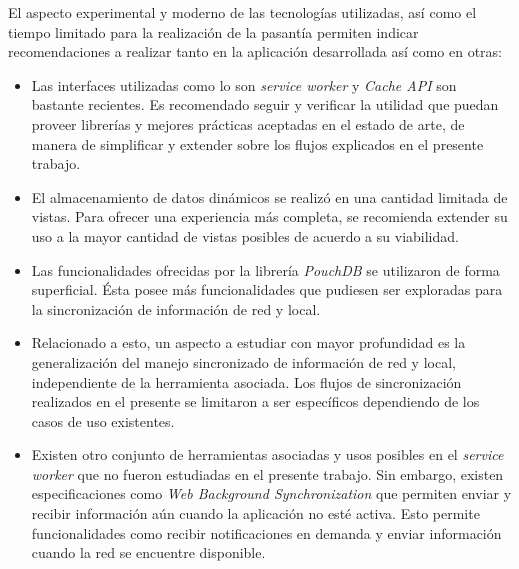 El aspecto experimental y moderno de las tecnologías utilizadas, así como el tiempo limitado para la realización de la pasantía permiten indicar recomendaciones a realizar tanto en la aplicación desarrollada así como en otras:

\begin{itemize}

  \item Las interfaces utilizadas como lo son \textit{service worker} y \textit{Cache API} son bastante recientes. Es recomendado seguir y verificar la utilidad que puedan proveer librerías y mejores prácticas aceptadas en el estado de arte, de manera de simplificar y extender sobre los flujos explicados en el presente trabajo.

  \item El almacenamiento de datos dinámicos se realizó en una cantidad limitada de vistas. Para ofrecer una experiencia más completa, se recomienda extender su uso a la mayor cantidad de vistas posibles de acuerdo a su viabilidad.

  \item Las funcionalidades ofrecidas por la librería \textit{PouchDB} se utilizaron de forma superficial. Ésta posee más funcionalidades que pudiesen ser exploradas para la sincronización de información de red y local.

  \item Relacionado a esto, un aspecto a estudiar con mayor profundidad es la generalización del manejo sincronizado de información de red y local, independiente de la herramienta asociada. Los flujos de sincronización realizados en el presente se limitaron a ser específicos dependiendo de los casos de uso existentes.

  \item Existen otro conjunto de herramientas asociadas y usos posibles en el \textit{service worker} que no fueron estudiadas en el presente trabajo. Sin embargo, existen especificaciones como \textit{Web Background Synchronization} que permiten enviar y recibir información aún cuando la aplicación no esté activa. Esto permite funcionalidades como recibir notificaciones en demanda y enviar información cuando la red se encuentre disponible.

\end{itemize}
